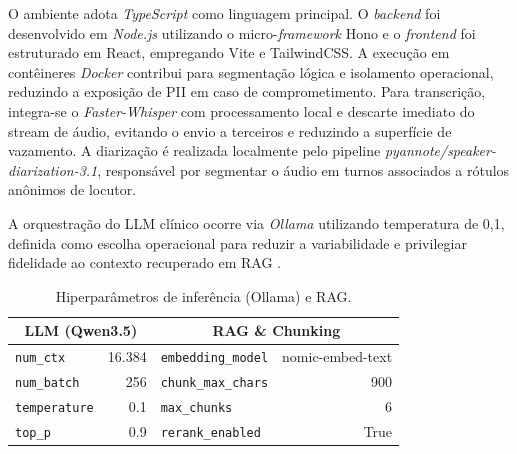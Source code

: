 \documentclass[12pt]{article}
\begin{document}
O ambiente adota \textit{TypeScript} como linguagem principal.
O \textit{backend} foi desenvolvido em \textit{Node.js} utilizando o micro-\textit{framework} Hono e o \textit{frontend} foi estruturado em React, empregando Vite e TailwindCSS.
A execução em contêineres \textit{Docker} contribui para segmentação lógica e isolamento operacional, reduzindo a exposição de PII em caso de comprometimento.
Para transcrição, integra-se o \textit{Faster-Whisper} com processamento local e descarte imediato do stream de áudio, evitando o envio a terceiros e reduzindo a superfície de vazamento.
A diarização é realizada localmente pelo pipeline \textit{pyannote/speaker-diarization-3.1}, responsável por segmentar o áudio em turnos associados a rótulos anônimos de locutor.


A orquestração do LLM clínico ocorre via \textit{Ollama} utilizando temperatura de 0,1, definida como escolha operacional para
reduzir a variabilidade e privilegiar fidelidade ao contexto recuperado em RAG \cite{Sharma2025RAGSurvey}.

\begin{table}[h!]
  \centering
  \caption{Hiperparâmetros de inferência (Ollama) e RAG.}
  \label{tab:hyperparams}
  \small
  \begin{tabular}{l r | l r}
    \toprule
    \multicolumn{2}{c}{\textbf{LLM (Qwen3.5)}} & \multicolumn{2}{c}{\textbf{RAG \& Chunking}} \\
    \midrule
    \texttt{num\_ctx}                          & 16.384 & \texttt{embedding\_model}  & nomic-embed-text \\
    \texttt{num\_batch}                        & 256    & \texttt{chunk\_max\_chars} & 900              \\
    \texttt{temperature}                       & 0.1    & \texttt{max\_chunks}       & 6                \\
    \texttt{top\_p}                            & 0.9    & \texttt{rerank\_enabled}   & True             \\
    \bottomrule
  \end{tabular}
\end{table}
\end{document}
